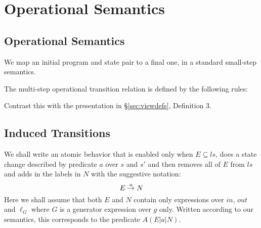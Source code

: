 \section{Operational Semantics}\label{sec:op-sem}

\subsection{Operational Semantics}

We map an initial program and state pair to a final one,
in a standard small-step semantics.

The multi-step operational transition relation
is defined by the following rules:

Contrast this with the presentation in \S\ref{sec:viewdefs}, Definition 3.


\subsection{Induced Transitions}

We shall write an atomic behavior
that is enabled only when $E \subseteq ls$,
does a state change described by predicate $a$ over $s$ and $s'$
and then removes all of $E$ from $ls$ and adds in the labels in $N$
with the suggestive notation:
\[
 E \stackrel{a}{\rightarrow} N
\]
Here we shall assume that both $E$ and $N$
contain only expressions over $in$, $out$ and $\ell_G$
where $G$ is a generator expression over $g$ only.
Written according to our semantics,
this corresponds to the predicate
$A(E|a|N)$.


